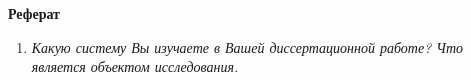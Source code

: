 \documentclass{article}
\begin{document}
    \begin{center}
    \Large
    \textbf{Реферат}
    \end{center}

    \begin{enumerate}
        \item \textit{Какую систему Вы изучаете в Вашей диссертационной работе? Что является объектом исследования.}

        
    \end{enumerate}
\end{document}
